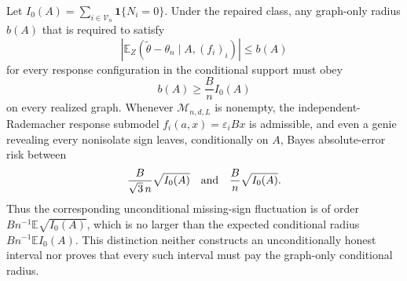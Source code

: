 Let \(I_0(A)=\sum_{i\in\mathcal V_n}\mathbf1\{N_i=0\}\).  Under the repaired class, any graph-only radius \(b(A)\) that is required to satisfy
\[
 \left|\mathbb E_Z(\widetilde\theta-\theta_n\mid A,(f_i)_i)\right|\leq b(A)
\]
for every response configuration in the conditional support must obey
\[
 b(A)\geq \frac{B}{n}I_0(A)
\]
on every realized graph.  Whenever \(\mathcal M_{n,d,L}\) is nonempty, the independent-Rademacher response submodel \(f_i(a,x)=\varepsilon_iBx\) is admissible, and even a genie revealing every nonisolate sign leaves, conditionally on \(A\), Bayes absolute-error risk between
\[
 \frac{B}{\sqrt3\,n}\sqrt{I_0(A)}
 \quad\hbox{and}\quad
 \frac{B}{n}\sqrt{I_0(A)}.
\]
Thus the corresponding unconditional missing-sign fluctuation is of order \(Bn^{-1}\mathbb E\sqrt{I_0(A)}\), which is no larger than the expected conditional radius \(Bn^{-1}\mathbb E I_0(A)\).  This distinction neither constructs an unconditionally honest interval nor proves that every such interval must pay the graph-only conditional radius.